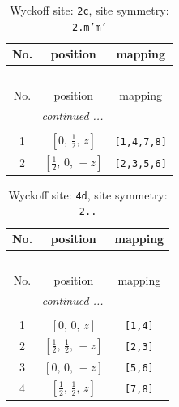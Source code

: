 \documentclass[fleqn,8pt]{jsarticle}
\begin{document}
\renewcommand{\arraystretch}{1.2}
\begin{longtable}{ccc}
\caption{Wyckoff site: {\tt 2c}, site symmetry: {\tt 2.m'm'}}
 \\
 \hline \hline
No. & position & mapping \\ \hline \endfirsthead

\multicolumn{2}{l}{\tablename\ \thetable{}} \\
 \hline \hline
No. & position & mapping \\ \hline \endhead

 \hline \hline
\multicolumn{2}{r}{\footnotesize\it continued ...} \\ \endfoot

 \hline \hline
\multicolumn{2}{r}{} \\ \endlastfoot

1 & $\left[ 0,\, \frac{1}{2},\, z \right]$ & {\tt [1,4,7,8]} \\ \hline
2 & $\left[ \frac{1}{2},\, 0,\, - z \right]$ & {\tt [2,3,5,6]} \\
\end{longtable}
\renewcommand{\arraystretch}{1.2}
\begin{longtable}{ccc}
\caption{Wyckoff site: {\tt 4d}, site symmetry: {\tt 2..}}
 \\
 \hline \hline
No. & position & mapping \\ \hline \endfirsthead

\multicolumn{2}{l}{\tablename\ \thetable{}} \\
 \hline \hline
No. & position & mapping \\ \hline \endhead

 \hline \hline
\multicolumn{2}{r}{\footnotesize\it continued ...} \\ \endfoot

 \hline \hline
\multicolumn{2}{r}{} \\ \endlastfoot

1 & $\left[ 0,\, 0,\, z \right]$ & {\tt [1,4]} \\ \hline
2 & $\left[ \frac{1}{2},\, \frac{1}{2},\, - z \right]$ & {\tt [2,3]} \\ \hline
3 & $\left[ 0,\, 0,\, - z \right]$ & {\tt [5,6]} \\ \hline
4 & $\left[ \frac{1}{2},\, \frac{1}{2},\, z \right]$ & {\tt [7,8]} \\
\end{longtable}
\renewcommand{\arraystretch}{1.2}
\end{document}
